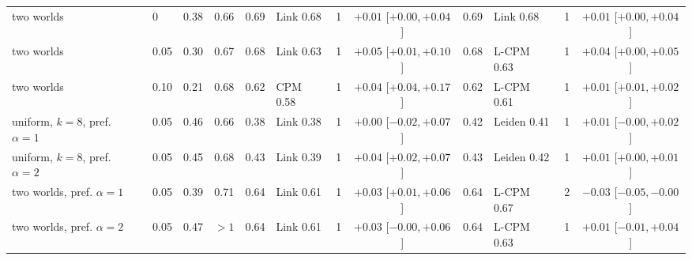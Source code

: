 \begin{table}[p]
\begin{ruledtabular}
\begin{tabular}{llcc|cl r c|cl r c}
two worlds & 0 & 0.38 & 0.66 & 0.69 & Link 0.68 & 1 & $+0.01$ [$+0.00,+0.04$] & 0.69 & Link 0.68 & 1 & $+0.01$ [$+0.00,+0.04$] \\
two worlds & 0.05 & 0.30 & 0.67 & 0.68 & Link 0.63 & 1 & $+0.05$ [$+0.01,+0.10$] & 0.68 & L-CPM 0.63 & 1 & $+0.04$ [$+0.00,+0.05$] \\
two worlds & 0.10 & 0.21 & 0.68 & 0.62 & CPM 0.58 & 1 & $+0.04$ [$+0.04,+0.17$] & 0.62 & L-CPM 0.61 & 1 & $+0.01$ [$+0.01,+0.02$] \\
uniform, $k=8$, pref. $\alpha=1$ & 0.05 & 0.46 & 0.66 & 0.38 & Link 0.38 & 1 & $+0.00$ [$-0.02,+0.07$] & 0.42 & Leiden 0.41 & 1 & $+0.01$ [$-0.00,+0.02$] \\
uniform, $k=8$, pref. $\alpha=2$ & 0.05 & 0.45 & 0.68 & 0.43 & Link 0.39 & 1 & $+0.04$ [$+0.02,+0.07$] & 0.43 & Leiden 0.42 & 1 & $+0.01$ [$+0.00,+0.01$] \\
two worlds, pref. $\alpha=1$ & 0.05 & 0.39 & 0.71 & 0.64 & Link 0.61 & 1 & $+0.03$ [$+0.01,+0.06$] & 0.64 & L-CPM 0.67 & 2 & $-0.03$ [$-0.05,-0.00$] \\
two worlds, pref. $\alpha=2$ & 0.05 & 0.47 & $>1$ & 0.64 & Link 0.61 & 1 & $+0.03$ [$-0.00,+0.06$] & 0.64 & L-CPM 0.63 & 1 & $+0.01$ [$-0.01,+0.04$] \\
\end{tabular}
\end{ruledtabular}
\end{table}
